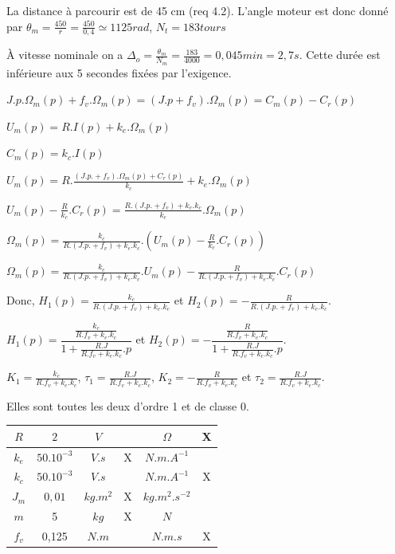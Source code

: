 
La distance à parcourir est de 45 cm (req 4.2). L'angle moteur est donc donné par $\theta_m=\frac{450}{r}=\frac{450}{0,4}\simeq 1125rad$, $N_t=183tours$


À vitesse nominale on a $\Delta_o=\frac{\theta_m}{N_m}=\frac{183}{4000}=0,045min=2,7s$. Cette durée est inférieure aux 5 secondes fixées par l'exigence.


$J.p.\Omega_m(p)+f_v.\Omega_m(p)=(J.p+f_v).\Omega_m(p)=C_m(p)-C_r(p)$ 

$U_m(p)=R.I(p)+k_e.\Omega_m(p)$ 

$C_m(p)=k_c.I(p)$
 

$U_m(p)=R.\frac{(J.p.+f_v).\Omega_m(p)+C_r(p)}{k_c}+k_e.\Omega_m(p)$ 

$U_m(p)-\frac{R}{k_c}.C_r(p)=\frac{R.(J.p.+f_v)+k_e.k_c}{k_c}.\Omega_m(p)$ 

$\Omega_m(p)=\frac{k_c}{R.(J.p.+f_v)+k_e.k_c}.(U_m(p)-\frac{R}{k_c}.C_r(p))$ 

$\Omega_m(p)=\frac{k_c}{R.(J.p.+f_v)+k_e.k_c}.U_m(p)-\frac{R}{R.(J.p.+f_v)+k_e.k_c}.C_r(p)$ 

Donc, $H_1(p)=\frac{k_c}{R.(J.p.+f_v)+k_e.k_c}$ et $H_2(p)=-\frac{R}{R.(J.p.+f_v)+k_e.k_c}$.


$H_1(p)=\dfrac{\frac{k_c}{R.f_v+k_e.k_c}}{1+\frac{R.J}{R.f_v+k_e.k_c}.p}$ et $H_2(p)=-\dfrac{\frac{R}{R.f_v+k_e.k_c}}{1+\frac{R.J}{R.f_v+k_e.k_c}.p}$.

$K_1=\frac{k_c}{R.f_v+k_e.k_c}$, $\tau_1=\frac{R.J}{R.f_v+k_e.k_c}$, $K_2=-\frac{R}{R.f_v+k_e.k_c}$ et $\tau_2=\frac{R.J}{R.f_v+k_e.k_c}$.


Elles sont toutes les deux d'ordre 1 et de classe 0.


\begin{center}
\begin{tabular}{|c|c||c|c|c|c|}
\hline
$R$ & $2$ & $V$ & & $\Omega$ & X \\
\hline
$k_e$ & $50.10^{-3}$ & $V.s$ & X & $N.m.A^{-1}$ & \\
\hline
$k_c$ & $50.10^{-3}$ & $V.s$ & & $N.m.A^{-1}$ & X \\
\hline
$J_m$ & $0,01$ & $kg.m^2$ & X & $kg.m^2.s^{-2}$ & \\
\hline
$m$ & 5 & $kg$ & X & $N$ & \\
\hline
$f_v$ & 0,125 & $N.m$ & & $N.m.s$ & X \\
\hline
\end{tabular}
\end{center}

